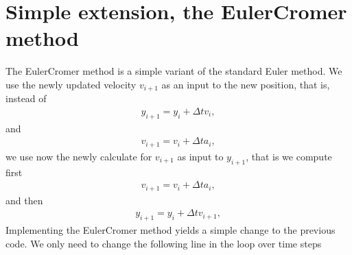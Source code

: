 \documentclass[letterpaper,10pt,english]{sphinxmanual}
\begin{document}
\section{Simple extension, the Euler\sphinxhyphen{}Cromer method}
\label{\detokenize{chapter1:simple-extension-the-euler-cromer-method}}
The Euler\sphinxhyphen{}Cromer method is a simple variant of the standard Euler
method. We use the newly updated velocity \(v_{i+1}\) as an input to the
new position, that is, instead of
\begin{equation*}
\begin{split}
y_{i+1} = y_i+\Delta t v_i,
\end{split}
\end{equation*}
and
\begin{equation*}
\begin{split}
v_{i+1} = v_i+\Delta t a_i,
\end{split}
\end{equation*}
we use now the newly calculate for \(v_{i+1}\) as input to \(y_{i+1}\), that is
we compute first
\begin{equation*}
\begin{split}
v_{i+1} = v_i+\Delta t a_i,
\end{split}
\end{equation*}
and then
\begin{equation*}
\begin{split}
y_{i+1} = y_i+\Delta t v_{i+1},
\end{split}
\end{equation*}
Implementing the Euler\sphinxhyphen{}Cromer method yields a simple change to the previous code. We only need to change the following line in the loop over time
steps

\begin{sphinxVerbatim}[commandchars=\\\{\}]
   
    \PYG{p}{[}\PYG{p}{]}  \PYG{p}{[}\PYG{p}{]}  \PYG{p}{[}\PYG{p}{]}
    \PYG{p}{[}\PYG{p}{]}  \PYG{p}{[}\PYG{p}{]}  \PYG{p}{[}\PYG{p}{]}
\end{sphinxVerbatim}
\end{document}
